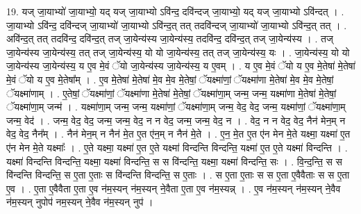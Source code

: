 \documentclass[17pt]{extarticle}
\begin{document}
19. यज् जा॒याभ्यो॑ जा॒याभ्यो॒ यद् यज् जा॒याभ्यो ऽवि॑न्द॒ दवि॑न्दज् जा॒याभ्यो॒ यद् यज् जा॒याभ्यो ऽवि॑न्दत् । . जा॒याभ्यो ऽवि॑न्द॒ दवि॑न्दज् जा॒याभ्यो॑ जा॒याभ्यो ऽवि॑न्द॒त् तत् तदवि॑न्दज् जा॒याभ्यो॑ जा॒याभ्यो ऽवि॑न्द॒त् तत् । . अवि॑न्द॒त् तत् तदवि॑न्द॒ दवि॑न्द॒त् तज् जा॒येन्य॑स्य जा॒येन्य॑स्य॒ तदवि॑न्द॒ दवि॑न्द॒त् तज् जा॒येन्य॑स्य । . तज् जा॒येन्य॑स्य जा॒येन्य॑स्य॒ तत् तज् जा॒येन्य॑स्य॒ यो यो जा॒येन्य॑स्य॒ तत् तज् जा॒येन्य॑स्य॒ यः । . जा॒येन्य॑स्य॒ यो यो जा॒येन्य॑स्य जा॒येन्य॑स्य॒ य ए॒व मे॒वं ॅयो जा॒येन्य॑स्य जा॒येन्य॑स्य॒ य ए॒वम् । . य ए॒व मे॒वं ॅयो य ए॒व मे॒तेषा॑ मे॒तेषा॑ मे॒वं ॅयो य ए॒व मे॒तेषा᳚म् । . ए॒व मे॒तेषा॑ मे॒तेषा॑ मे॒व मे॒व मे॒तेषां॒ ॅयक्ष्मा॑णां॒ ॅयक्ष्मा॑णा मे॒तेषा॑ मे॒व मे॒व मे॒तेषां॒ ॅयक्ष्मा॑णाम् । . ए॒तेषां॒ ॅयक्ष्मा॑णां॒ ॅयक्ष्मा॑णा मे॒तेषा॑ मे॒तेषां॒ ॅयक्ष्मा॑णा॒म् जन्म॒ जन्म॒ यक्ष्मा॑णा मे॒तेषा॑ मे॒तेषां॒ ॅयक्ष्मा॑णा॒म् जन्म॑ । . यक्ष्मा॑णा॒म् जन्म॒ जन्म॒ यक्ष्मा॑णां॒ ॅयक्ष्मा॑णा॒म् जन्म॒ वेद॒ वेद॒ जन्म॒ यक्ष्मा॑णां॒ ॅयक्ष्मा॑णा॒म् जन्म॒ वेद॑ । . जन्म॒ वेद॒ वेद॒ जन्म॒ जन्म॒ वेद॒ न न वेद॒ जन्म॒ जन्म॒ वेद॒ न । . वेद॒ न न वेद॒ वेद॒ नैन॑ मेन॒म् न वेद॒ वेद॒ नैन᳚म् । . नैन॑ मेन॒म् न नैन॑ मे॒त ए॒त ए॑न॒म् न नैन॑ मे॒ते । . ए॒न॒ मे॒त ए॒त ए॑न मेन मे॒ते यक्ष्मा॒ यक्ष्मा॑ ए॒त ए॑न मेन मे॒ते यक्ष्माः᳚ । . ए॒ते यक्ष्मा॒ यक्ष्मा॑ ए॒त ए॒ते यक्ष्मा॑ विन्दन्ति विन्दन्ति॒ यक्ष्मा॑ ए॒त ए॒ते यक्ष्मा॑ विन्दन्ति । . यक्ष्मा॑ विन्दन्ति विन्दन्ति॒ यक्ष्मा॒ यक्ष्मा॑ विन्दन्ति॒ स स वि॑न्दन्ति॒ यक्ष्मा॒ यक्ष्मा॑ विन्दन्ति॒ सः । . वि॒न्द॒न्ति॒ स स वि॑न्दन्ति विन्दन्ति॒ स ए॒ता ए॒ताः स वि॑न्दन्ति विन्दन्ति॒ स ए॒ताः । . स ए॒ता ए॒ताः स स ए॒ता ए॒वैवैताः स स ए॒ता ए॒व । . ए॒ता ए॒वैवैता ए॒ता ए॒व न॑म॒स्यन् न॑म॒स्यन् ने॒वैता ए॒ता ए॒व न॑म॒स्यन्न् । . ए॒व न॑म॒स्यन् न॑म॒स्यन् ने॒वैव न॑म॒स्यन् नुपोप॑ नम॒स्यन् ने॒वैव न॑म॒स्यन् नुप॑ । \newline
\end{document}
